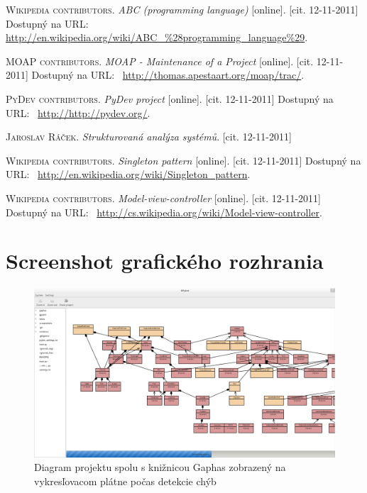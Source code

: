 \documentclass[11pt,oneside,final]{fithesis2}
\begin{document}
\begin{thebibliography}{99}
    \textsc{Wikipedia contributors}.
    \textit{ABC (programming language)} [online].
    [cit. 12-11-2011]
    Dostupný na URL:~
    \url{http://en.wikipedia.org/wiki/ABC_%28programming_language%29}.

    \textsc{MOAP contributors}.
    \textit{MOAP - Maintenance of a Project} [online].
    [cit. 12-11-2011]
    Dostupný na URL:~
    \url{http://thomas.apestaart.org/moap/trac/}.

    \textsc{PyDev contributors}.
    \textit{PyDev project} [online].
    [cit. 12-11-2011]
    Dostupný na URL:~
    \url{http://http://pydev.org/}.
	
    \textsc{Jaroslav Ráček}.
    \textit{Strukturovaná analýza systémů}.
    [cit. 12-11-2011]

    \textsc{Wikipedia contributors}.
    \textit{Singleton pattern} [online].
    [cit. 12-11-2011]
    Dostupný na URL:~
    \url{http://en.wikipedia.org/wiki/Singleton_pattern}.
	
    \textsc{Wikipedia contributors}.
    \textit{Model-view-controller} [online].
    [cit. 12-11-2011]
    Dostupný na URL:~
    \url{http://cs.wikipedia.org/wiki/Model-view-controller}.
    		
\end{thebibliography}

\appendix
\chapter{Screenshot grafického rozhrania}

	\begin{figure}[htb]
	 \centering
	 \includegraphics[width=\textwidth]{images/gpylint}
	 \caption{Diagram projektu spolu s knižnicou Gaphas zobrazený na vykresľovacom plátne počas detekcie chýb}
	\end{figure}
\end{document}
